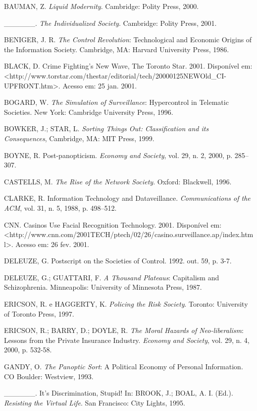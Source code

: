 BAUMAN, Z. \emph{Liquid Modernity}. Cambridge: Polity Press, 2000.

\_\_\_\_\_\_. \emph{The Individualized Society}. Cambridge: Polity
Press, 2001.

BENIGER, J. R. \emph{The Control Revolution}: Technological and Economic
Origins of the Information Society. Cambridge, MA: Harvard University
Press, 1986.

BLACK, D. Crime Fighting's New Wave, The Toronto Star. 2001. Disponível
em:
\textless{}http://www.torstar.com/thestar/editorial/tech/20000125NEWOld\_CI-UPFRONT.htm\textgreater{}.
Acesso em: 25 jan. 2001.

BOGARD, W. \emph{The Simulation of Surveillance}: Hypercontrol in
Telematic Societies. New York: Cambridge University Press, 1996.

BOWKER, J.; STAR, L. \emph{Sorting Things Out: Classification and its
Consequences}, Cambridge, MA: MIT Press, 1999.

BOYNE, R. Post-panopticism. \emph{Economy and Society}, vol. 29, n. 2,
2000, p. 285--307.

CASTELLS, M. \emph{The Rise of the Network Society}. Oxford: Blackwell,
1996.

CLARKE, R. Information Technology and Dataveillance.
\emph{Communications of the ACM}, vol. 31, n. 5, 1988, p. 498--512.

CNN. Casinos Use Facial Recognition Technology. 2001. Disponível em:
\textless{}http://www.cnn.com/2001TECH/ptech/02/26/casino.surveillance.ap/index.html\textgreater{}.
Acesso em: 26 fev. 2001.

DELEUZE, G. Postscript on the Societies of Control. 1992. out. 59, p.
3-7.

DELEUZE, G.; GUATTARI, F. \emph{A Thousand Plateaus}: Capitalism and
Schizophrenia. Minneapolis: University of Minnesota Press, 1987.

ERICSON, R. e HAGGERTY, K. \emph{Policing the Risk Society}. Toronto:
University of Toronto Press, 1997.

ERICSON, R.; BARRY, D.; DOYLE, R. \emph{The Moral Hazards of
Neo-liberalism}: Lessons from the Private Insurance Industry.
\emph{Economy and Society}, vol. 29, n. 4, 2000, p. 532-58.

GANDY, O. \emph{The Panoptic Sort}: A Political Economy of Personal
Information. CO Boulder: Westview, 1993.

\_\_\_\_\_\_. It's Discrimination, Stupid! In: BROOK, J.; BOAL, A. I.
(Ed.). \emph{Resisting the Virtual Life}. San Francisco: City Lights,
1995.

